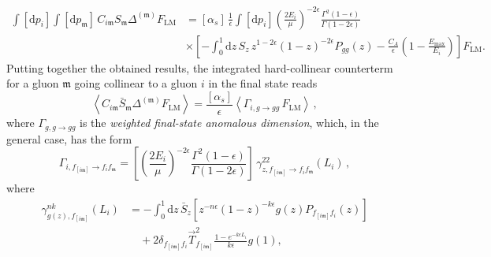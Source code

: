 \documentclass[a4paper, 12pt]{book}
\newcommand{\um}{\mathfrak{m}}
\begin{document}
\begin{align}
  \int [\mathrm{d}p_i] \int [\mathrm{d}p_\um] \, C_{i\um} S_{\um} \Delta^{(\um)} F_{\mathrm{LM}} 
  &= [\alpha_s] \, \frac{1}{\epsilon} \int[\mathrm{d}p_i] \left(\frac{2E_i}{\mu} \right)^{-2\epsilon} \frac{\Gamma^2(1-\epsilon)}{\Gamma(1-2\epsilon)} \nonumber \\
  & \times \left[ - \int_0^1 \mathrm{d}z \, S_z \, z^{1-2\epsilon} (1-z)^{-2\epsilon} P_{gg}(z) - \frac{C_A}{\epsilon} \left(1-\frac{E_{\text{max}}}{E_i}\right) \right] F_{\mathrm{LM}} .
\end{align}
Putting together the obtained results, the integrated hard-collinear counterterm for a gluon $\um$ going collinear to a gluon $i$ in the final state reads
\begin{equation}
  \left<  C_{i\um} \bar{S}_{\um} \Delta^{(\um)} F_{\mathrm{LM}}\right> = \frac{[\alpha_s]}{\epsilon} \left< \Gamma_{i,g \to gg} \, F_{\mathrm{LM}}\right> \, ,
  \label{yellow}
\end{equation}
where $\Gamma_{g,g \to gg}$ is the \emph{weighted final-state anomalous dimension}, which, in the general case, has the form
\begin{equation}
  \Gamma_{i,f_{[i\um]}\to f_i f_\um} = \left[\left(\frac{2E_i}{\mu}\right)^{-2\epsilon} \frac{\Gamma^2(1-\epsilon)}{\Gamma(1-2\epsilon)}\right] \, \gamma^{22}_{z,f_{[i\um]} \to f_i f_\um} (L_i) \, ,
  \label{gen-final-anom-dim}
\end{equation}
where 
\begin{align}
  \gamma^{nk}_{g(z),f_{[i\um]}} (L_i) 
  &= - \int_0^1 \mathrm{d}z \, \bar{S}_z \left[z^{-n\epsilon}(1-z)^{-k\epsilon}g(z)P_{f_{[i\um]}f_i}(z)\right] \nonumber \\
  &\quad + 2 \delta_{f_{[i\um]}f_i} \vec{T}^2_{f_{[i\um]}} \frac{1-e^{-k \epsilon L_i}}{k\epsilon} g(1) ,
  \label{gen-an-dim}
\end{align}
\end{document}
